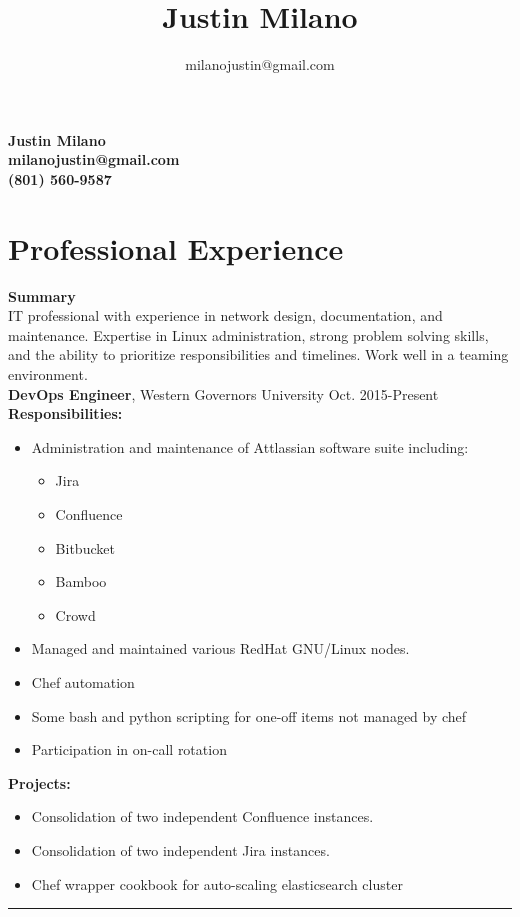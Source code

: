 \documentclass[10pt]{article}
\title{\bfseries\Huge Justin Milano}
\author{milanojustin@gmail.com}
\date{}
\newenvironment{myitemize}
{ \begin{itemize}[topsep=0pt]
  	\vspace{-4pt}
    \setlength{\itemsep}{0pt}
    \setlength{\parskip}{0pt}
    \setlength{\parsep}{0pt}     }
{ \end{itemize}                  }
\newcommand{\breakrule}{
  	\color{lightgray}
  	\vspace{-4pt}
	\begin{center}
		\noindent\rule{7cm}{0.5pt}
	\end{center}
	}
\begin{document}
\begin{center}
	{\bf \Huge Justin Milano}\\
	\vspace{5pt}
	{\bf \large milanojustin@gmail.com}\\
  {\bf \large (801) 560-9587}
\end{center}
\vspace{-5pt}
\section*{Professional Experience}

\noindent
{\large {\bf Summary}} \\
IT professional with experience in network design, documentation, and maintenance. Expertise in Linux administration, strong problem solving skills, and the ability to prioritize responsibilities and timelines. Work well in a teaming environment. \\

\noindent
{\large {\bf DevOps Engineer}, Western Governors University \hfill Oct. 2015-Present } \\
{\bf Responsibilities:}
\begin{myitemize}
  \item Administration and maintenance of Attlassian software suite including:
    \begin{myitemize}
      \item Jira
      \item Confluence
      \item Bitbucket
      \item Bamboo
      \item Crowd
    \end{myitemize}
  \item Managed and maintained various RedHat GNU/Linux nodes.
  \item Chef automation
  \item Some bash and python scripting for one-off items not managed by chef
  \item Participation in on-call rotation
\end{myitemize} 
{\bf Projects:}
\begin{myitemize}
  \item Consolidation of two independent Confluence instances.
  \item Consolidation of two independent Jira instances.
  \item Chef wrapper cookbook for auto-scaling elasticsearch cluster
\end{myitemize} 
{\breakrule}
\end{document}
